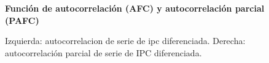 %
\begin{figure}[H]
	\centering
	\textbf{Funci\'on de autocorrelaci\'on (AFC) y autocorrelaci\'on parcial (PAFC)}\par\medskip
	\caption{Izquierda: autocorrelacion de serie de ipc diferenciada. Derecha: autocorrelación parcial de serie de IPC diferenciada.}\label{fig22}
\end{figure}




